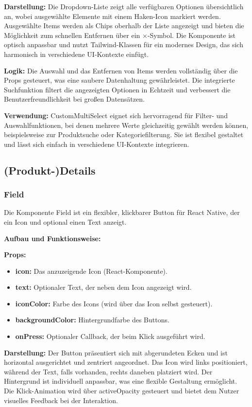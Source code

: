 \textbf{Darstellung:}
Die Dropdown-Liste zeigt alle verfügbaren Optionen übersichtlich an, wobei ausgewählte Elemente mit einem Haken-Icon markiert werden. Ausgewählte Items werden als Chips oberhalb der Liste angezeigt und bieten die Möglichkeit zum schnellen Entfernen über ein ×-Symbol. Die Komponente ist optisch anpassbar und nutzt Tailwind-Klassen für ein modernes Design, das sich harmonisch in verschiedene UI-Kontexte einfügt.

\textbf{Logik:}
Die Auswahl und das Entfernen von Items werden vollständig über die Props gesteuert, was eine saubere Datenhaltung gewährleistet. Die integrierte Suchfunktion filtert die angezeigten Optionen in Echtzeit und verbessert die Benutzerfreundlichkeit bei großen Datensätzen.

\noindent\textbf{Verwendung:} CustomMultiSelect eignet sich hervorragend für Filter- und Auswahlfunktionen, bei denen mehrere Werte gleichzeitig gewählt werden können, beispielsweise zur Produktsuche oder Kategoriefilterung. Sie ist flexibel gestaltet und lässt sich einfach in verschiedene UI-Kontexte integrieren.

\subsection{(Produkt-)Details}

\subsubsection{Field}
Die Komponente Field ist ein flexibler, klickbarer Button für React Native, der ein Icon und optional einen Text anzeigt.

\noindent\textbf{Aufbau und Funktionsweise:}

\textbf{Props:}
\begin{itemize}
    \item \textbf{icon:} Das anzuzeigende Icon (React-Komponente).
    \item \textbf{text:} Optionaler Text, der neben dem Icon angezeigt wird.
    \item \textbf{iconColor:} Farbe des Icons (wird über das Icon selbst gesteuert).
    \item \textbf{backgroundColor:} Hintergrundfarbe des Buttons.
    \item \textbf{onPress:} Optionaler Callback, der beim Klick ausgeführt wird.
\end{itemize}

\textbf{Darstellung:}
Der Button präsentiert sich mit abgerundeten Ecken und ist horizontal ausgerichtet und zentriert angeordnet. Das Icon wird links positioniert, während der Text, falls vorhanden, rechts daneben platziert wird. Der Hintergrund ist individuell anpassbar, was eine flexible Gestaltung ermöglicht. Die Klick-Animation wird über activeOpacity gesteuert und bietet dem Nutzer visuelles Feedback bei der Interaktion.

